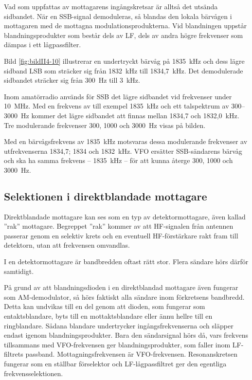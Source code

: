 Vad som uppfattas av mottagarens ingångskretsar är alltså det utsända sidbandet.
När en SSB-signal demoduleras, så blandas den lokala bärvågen i mottagaren med
de mottagna modulationsprodukterna.
Vid blandningen uppstår blandningsprodukter som består dels av LF, dels av
andra högre frekvenser som dämpas i ett lågpassfilter.

Bild \ref{fig:bildII4-10} illustrerar en undertryckt bärvåg på 1835~kHz och
dess lägre sidband LSB som sträcker sig från 1832~kHz till 1834,7~kHz.
Det demodulerade sidbandet sträcker sig från 300~Hz till 3~kHz.

Inom amatörradio används för SSB det lägre sidbandet vid frekvenser
under \SI{10}{\mega\hertz}.
Med en frekvens av till exempel 1835~kHz och ett talspektrum av 300--3000~Hz
kommer det lägre sidbandet att finnas mellan 1834,7 och 1832,0~kHz.
Tre modulerande frekvenser 300, 1000 och \SI{3000}{\hertz} visas på bilden.

Med en bärvågsfrekvens av \SI{1835}{\kilo\hertz} motsvaras dessa modulerande
frekvenser av utfrekvenserna 1834,7; 1834 och \SI{1832}{\kilo\hertz}.
VFO ersätter SSB-sändarens bärvåg och ska ha samma frekvens -- 1835~kHz --
för att kunna återge 300, 1000 och \SI{3000}{\hertz}.

\subsection{Selektionen i direktblandade mottagare}

Direktblandade mottagare kan ses som en typ av detektormottagare, även
kallad ''rak'' mottagare.
Begreppet ''rak'' kommer av att HF-signalen från antennen passerar genom en
selektiv krets och en eventuell HF-förstärkare rakt fram till detektorn,
utan att frekvensen omvandlas.

I en detektormottagare är bandbredden oftast rätt stor.
Flera sändare hörs därför samtidigt.

På grund av att blandningsdioden i en direktblandad mottagare även fungerar
som AM-demodulator, så hörs faktiskt alla sändare inom förkretsens bandbredd.
Detta kan undvikas till en del genom att dioden, som fungerar som
entaktsblandare, byts till en mottaktsblandare eller ännu hellre till en
ringblandare.
Sådana blandare undertrycker ingångsfrekvenserna och släpper endast igenom
blandningsprodukter.
Bara den sändarsignal hörs då, vars frekvens tillsammans med VFO-frekvensen
ger blandningsprodukter, som faller inom LF-filtrets passband.
Mottagningsfrekvensen är VFO-frekvensen.
Resonanskretsen fungerar som en ställbar förselektor och LF-lågpassfiltret
ger den egentliga frekvensselektionen.


